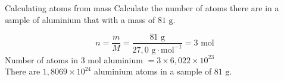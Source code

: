     \noindent
\label{m38717*secfhsst!!!underscore!!!id494}
      \noindent
      \begin{wex}{Calculating atoms from mass }{
Calculate the number of atoms there are in a sample of aluminium that with a mass of $81 \text{ g}$.
      }
{
      \label{m38717*id277959}\nopagebreak\noindent{}
        
    \begin{equation*}
    n=\frac{m}{M}=\frac{81 \text{ g}}{27,0 \text{ g} \cdot \text{mol}^{-1}} = 3 \text{ mol}
      \end{equation*}
      \label{m38717*id278019}Number of atoms in $3$ mol aluminium $=3 \times 6,022 \times 10^{23}$ \\
      \label{m38717*id278053}There are $1,8069 \times 10^{24}$ aluminium atoms in a sample of $81 \text{ g}$.
}
    \end{wex}
    \noindent
\label{m38717*secfhsst!!!underscore!!!id539}
